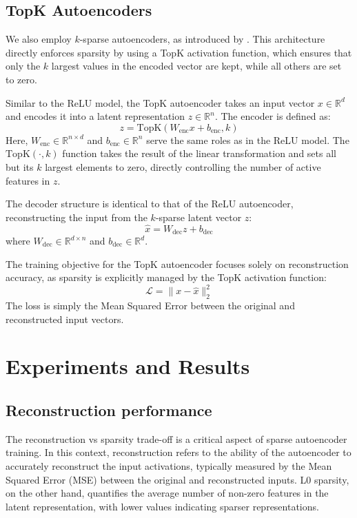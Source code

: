 \documentclass{article}
\begin{document}
\subsection{TopK Autoencoders}

We also employ $k$-sparse autoencoders, as introduced by \cite{Makhzani and Frey, 2013}. This architecture directly enforces sparsity by using a TopK activation function, which ensures that only the $k$ largest values in the encoded vector are kept, while all others are set to zero.

Similar to the ReLU model, the TopK autoencoder takes an input vector $x \in \mathbb{R}^d$ and encodes it into a latent representation $z \in \mathbb{R}^n$. The encoder is defined as:
\[ z = \text{TopK}(W_{\text{enc}}x + b_{\text{enc}}, k) \]
Here, $W_{\text{enc}} \in \mathbb{R}^{n \times d}$ and $b_{\text{enc}} \in \mathbb{R}^n$ serve the same roles as in the ReLU model. The $\text{TopK}(\cdot, k)$ function takes the result of the linear transformation and sets all but its $k$ largest elements to zero, directly controlling the number of active features in $z$.

The decoder structure is identical to that of the ReLU autoencoder, reconstructing the input from the $k$-sparse latent vector $z$:
\[ \hat{x} = W_{\text{dec}}z + b_{\text{dec}} \]
where $W_{\text{dec}} \in \mathbb{R}^{d \times n}$ and $b_{\text{dec}} \in \mathbb{R}^d$.

The training objective for the TopK autoencoder focuses solely on reconstruction accuracy, as sparsity is explicitly managed by the TopK activation function:
\[ \mathcal{L} = \|x - \hat{x}\|^2_2 \]
The loss is simply the Mean Squared Error between the original and reconstructed input vectors.
\section{Experiments and Results}
\label{sec:experiments}


\subsection{Reconstruction performance}
The reconstruction vs sparsity trade-off is a critical aspect of sparse autoencoder training. In this context, reconstruction refers to the ability of the autoencoder to accurately reconstruct the input activations, typically measured by the Mean Squared Error (MSE) between the original and reconstructed inputs. L0 sparsity, on the other hand, quantifies the average number of non-zero features in the latent representation, with lower values indicating sparser representations.
\end{document}
